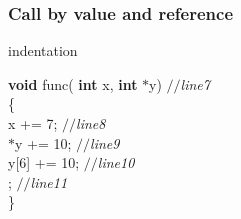 \documentclass[compress]{beamer}
\begin{document}
\frame
{
  \frametitle{Call by value and reference}
\begin{small}
{\scriptsize
{\small
\expandafter\ifx\csname indentation\endcsname\relax
\newlength{\indentation}\fi
\setlength{\indentation}{0.5em}
\begin{flushleft}
{\bf void\/} func( {\bf int\/} x, {\bf int\/} $\ast$y)                                                       \hfill{\em $//$\hspace*{1\indentation}line\hspace*{1\indentation}7\hspace*{1\indentation}}\mbox{}\\
\{\mbox{}\\
\hspace*{3\indentation}x += 7;                                                                   \hfill{\em $//$\hspace*{1\indentation}line\hspace*{1\indentation}8\hspace*{1\indentation}}\mbox{}\\
\hspace*{3\indentation}$\ast$y += 10;                                                             \hfill{\em $//$\hspace*{1\indentation}line\hspace*{1\indentation}9\hspace*{1\indentation}}\mbox{}\\
\hspace*{3\indentation}y[6] += 10;                                                          \hfill{\em $//$\hspace*{1\indentation}line\hspace*{1\indentation}10\hspace*{1\indentation}}\mbox{}\\
\hspace*{3\indentation}{\bf return\/};                                                \hfill{\em $//$\hspace*{1\indentation}line\hspace*{1\indentation}11\hspace*{1\indentation}}\mbox{}\\
\}\mbox{}\\
\end{flushleft}}
}
\end{small}
}
\end{document}
